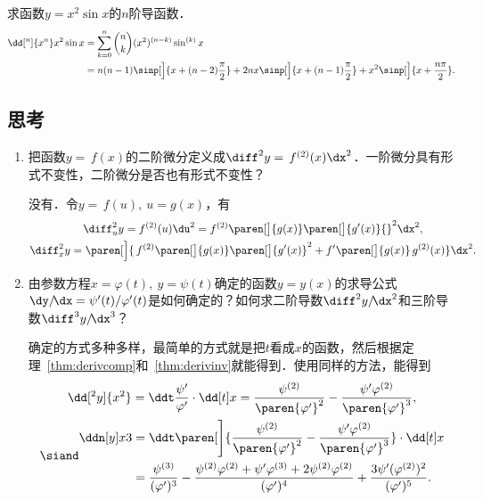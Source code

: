 \begin{example*}
  求函数\(y = x^2 \sin x\)的\(n\)阶导函数．
  \begin{equation*}
    \begin{split}
      \dd[^n]{x^n} x^2 \sin x
      &= \sum_{k=0}^n \binom nk (x^2)^{(n-k)} \sin^{(k)}x \\
      &= n(n-1) \sinp[\Big]{x+(n-2)\frac{\pi}{2}}
      + 2nx \sinp[\Big]{x+(n-1)\frac{\pi}{2}}
      + x^2 \sinp[\Big]{x+\frac{n\pi}{2}}.
    \end{split}
  \end{equation*}
\end{example*}

\subsection*{思考}

\begin{enumerate}
\item 把函数\(y = \,f(x)\)的二阶微分定义成\(\diff^2y = \,f^{(2)}(x) \dx^2\)．一阶微分具有形式不变性，二阶微分是否也有形式不变性？

  \ifshowsolp
  没有．令\(y = \,f(u),\ u = g(x)\)，有
  \begin{gather*}
    \diff_u^2 y
    = f^{(2)}(u) \du^2
    = f^{(2)}\paren[\big]{g(x)} \paren[\big]{g'(x)}{}^2 \dx^2, \\
    \diff_x^2 y
    = \paren[\Big]{\,f^{(2)}\paren[\big]{g(x)} \paren[\big]{g'(x)}^2 + f'\paren[\big]{g(x)}\,g^{(2)}(x)} \dx^2.
  \end{gather*}
  \fi

\item 由参数方程\(x = \varphi(t),\ y = \psi(t)\)确定的函数\(y = y(x)\)的求导公式\(\dy/\!\dx = \psi'(t)/\varphi'(t)\)是如何确定的？如何求二阶导数\(\diff^2y/\!\dx^2\)和三阶导数\(\diff^3y/\!\dx^3\)？

  \ifshowsolp
  确定的方式多种多样，最简单的方式就是把\(t\)看成\(x\)的函数，然后根据定理~\ref{thm:derivcomp}和~\ref{thm:derivinv}就能得到．使用同样的方法，能得到
  \begin{gather*}
    \dd[^2y]{x^2}
    = \ddt \frac{\psi'}{\varphi'} \cdot \dd[t]x
    = \frac{\psi^{(2)}}{\paren{\varphi'}^2}
    - \frac{\psi'\varphi^{(2)}}{\paren{\varphi'}^3}, \\
    \siand
    \begin{split}
      \ddn[y]x3
      &= \ddt \paren[\Bigg]{\frac{\psi^{(2)}}{\paren{\varphi'}^2}
        - \frac{\psi'\varphi^{(2)}}{\paren{\varphi'}^3}} \cdot \dd[t]x \\
      &= \frac{\psi^{(3)}}{(\varphi')^3}
      - \frac{\psi^{(2)}\varphi^{(2)}
        + \psi'\varphi^{(3)}
        + 2\psi^{(2)}\varphi^{(2)}}{(\varphi')^4}
      + \frac{3\psi'(\varphi^{(2)})^2}{(\varphi')^5}.
    \end{split}
  \end{gather*}
  \fi
\end{enumerate}

